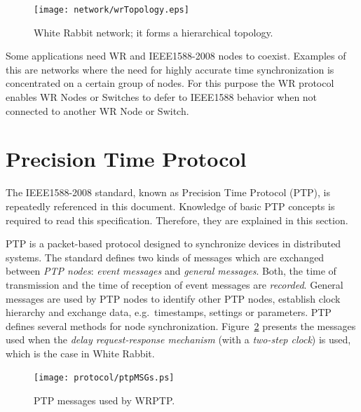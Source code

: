 \documentclass[a4paper, 12pt]{article}
\begin{document}
\begin{figure}[ht!]
  \centering
  \texttt{[image: network/wrTopology.eps]}
  \caption{White Rabbit network; it forms a hierarchical topology.}
  \label{fig:wrNetwork}
\end{figure}

Some applications need WR and IEEE1588-2008 nodes to coexist. Examples
of this are networks where the need for highly accurate time synchronization is concentrated on a
certain group of nodes. For this purpose the WR protocol enables WR Nodes or Switches 
to defer to IEEE1588 behavior when not connected to another WR Node or Switch.




\newpage

\section{Precision Time Protocol}
\label{sec:ptp}

The IEEE1588-2008 standard, known as Precision Time Protocol (PTP), 
is repeatedly referenced in this document. Knowledge of basic PTP concepts is 
required to read this specification. Therefore, they are explained in this section. 

PTP is a packet-based protocol designed to synchronize devices in distributed systems. 
The standard defines two kinds of messages which are exchanged between \textit{PTP nodes}: 
\textit{event messages} and \textit{general messages}. Both, the time of transmission and 
the time of reception of event messages are \textit{recorded}. General messages 
are used by PTP nodes to identify other PTP nodes, establish clock hierarchy and 
exchange data, e.g.~timestamps, settings or parameters. PTP defines several methods 
for node synchronization. Figure~\ref{fig:wrPTPmsgs} presents the messages used when 
the \textit{delay request-response mechanism} (with a \textit{two-step clock}) is used, 
which is the case in White Rabbit. 

\begin{figure}[ht!]
  \centering
  \texttt{[image: protocol/ptpMSGs.ps]}
  \caption{PTP messages used by WRPTP.}
  \label{fig:wrPTPmsgs}
\end{figure}
\end{document}
